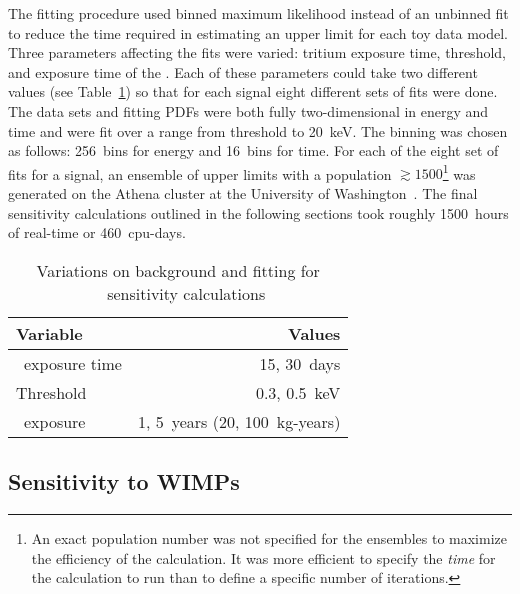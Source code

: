 	The fitting procedure used binned maximum likelihood instead of an unbinned fit to reduce the time required in estimating an upper limit for each toy data model.  Three parameters affecting the fits were varied: tritium exposure time, threshold, and exposure time of the \minmod.  Each of these parameters could take two different values (see Table~\ref{tab:SensFitValues}) so that for each signal eight different sets of fits were done.  The data sets and fitting PDFs were both fully two-dimensional in energy and time and were fit over a range from threshold to 20~keV.  The binning was chosen as follows: 256~bins for energy and 16~bins for time.  For each of the eight set of fits for a signal, an ensemble of upper limits with a population $\gtrsim1500$\footnote{ An exact population number was not specified for the ensembles to maximize the efficiency of the calculation.  It was more efficient to specify the \emph{time} for the calculation to run than to define a specific number of iterations.} was generated on the Athena cluster at the University of Washington~\cite{Athena}.  The final sensitivity calculations outlined in the following sections took roughly 1500~hours of real-time or 460~cpu-days.
	
			\begin{table}
				\centering
				\caption[Variations on background and fitting for \MJ~\minmod~sensitivity calculations]
				{Variations on background and fitting for \MJ~\minmod~sensitivity calculations}
				\label{tab:SensFitValues}
				\begin{tabular}{l r}
					\toprule
					Variable & Values \\
					\midrule
					\hthree~exposure time & 15, 30~days \\
					Threshold & 0.3, 0.5~keV \\
					\minmod~exposure & 1, 5~years (20, 100~kg-years) \\
					\bottomrule 
				\end{tabular}				
			\end{table}		
		
		\subsection{Sensitivity to WIMPs}
		\label{sec:MJSensitivityToWIMP}
		
